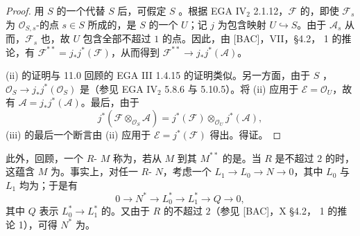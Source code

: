 \begin{proof}
用 $S$ 的一个代替 $S$ 后，可假定 $S$ 。根据 EGA IV$_2$ 2.1.12，$\mathcal F$ 的，即使 $\mathcal F_s$ 为 $\mathcal O_{S,s}$-的点 $s\in S$ 所成的，是 $S$ 的一个 $U$；记 $j$ 为包含映射 $U\hookrightarrow S$。由于 $\mathcal A_s$ 从而，$\mathcal F_s$ 也，故 $U$ 包含全部不超过 $1$ 的点。因此，由 [BAC]，VII，§4.2， 1 的推论，有 $\mathcal F^{**}=j_*j^*(\mathcal F)$，从而得到 $\mathcal F^{**}\to j_*j^*(\mathcal A)$。

(ii) 的证明与 11.0 回顾的 EGA III 1.4.15 的证明类似。另一方面，由于 $S$ ， $\mathcal O_S\to j_*j^*(\mathcal O_S)$ 是（参见 EGA IV$_2$ 5.8.6 与 5.10.5）。将 (ii) 应用于 $\mathcal E=\mathcal O_U$，故有 $\mathcal A=j_*j^*(\mathcal A)$。最后，由于
\[
j^*(\mathcal F\otimes_{\mathcal O_S}\mathcal A)
=j^*(\mathcal F)\otimes_{\mathcal O_U}j^*(\mathcal A),
\]
(iii) 的最后一个断言由 (ii) 应用于 $\mathcal E=j^*(\mathcal F)$ 得出。得证。
\end{proof}

此外，回顾，一个 $R$- $M$ 称为，若从 $M$ 到其 $M^{**}$ 的是。当 $R$ 是不超过 $2$ 的时，这蕴含 $M$ 为。事实上，对任一 $R$- $N$，考虑一个 $L_1\to L_0\to N\to0$，其中 $L_0$ 与 $L_1$ 均为；于是有
\[
0\longrightarrow N^*\longrightarrow L_0^*\longrightarrow L_1^*\longrightarrow Q\longrightarrow0,
\]
其中 $Q$ 表示 $L_0^*\to L_1^*$ 的。又由于 $R$ 的不超过 $2$（参见 [BAC]，X §4.2， 1 的推论 1），可得 $N^*$ 为。

